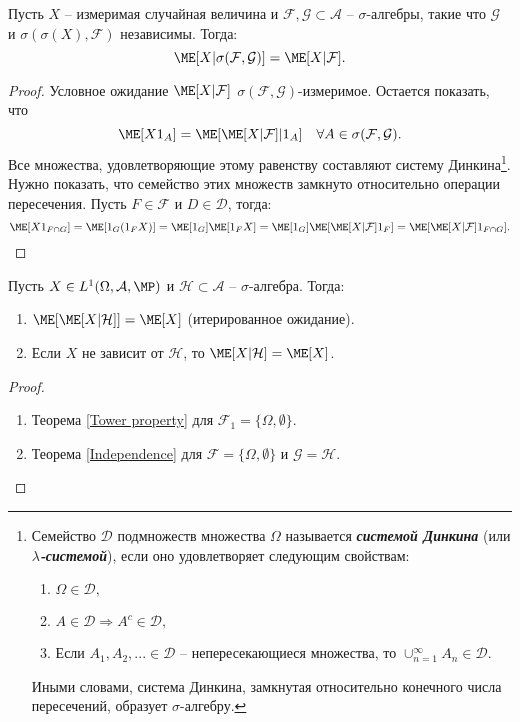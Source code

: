 \begin{thm} \label{Independence}
	Пусть $X$ -- измеримая случайная величина и $\mathcal{F}, \mathcal{G} \subset \mathcal{A}$ -- $\sigma$-алгебры, такие что $\mathcal{G}$ и $\sigma(\sigma(X), \mathcal{F})$ независимы. Тогда:
	\[ \ME[X|\sigma(\mathcal{F}, \mathcal{G})] = \ME[X|\mathcal{F}]. \]
\end{thm}
\begin{proof}
	Условное ожидание $\ME[X|\mathcal{F}]$ $\sigma(\mathcal{F},\mathcal{G})$-измеримое. Остается показать, что
	\[ \ME[X1_A]=\ME[\ME[X|\mathcal{F}]|1_A] \quad \forall A \in \sigma(\mathcal{F},\mathcal{G}). \]
	Все множества, удовлетворяющие этому равенству составляют систему Динкина\footnote{Семейство $\mathcal{D}$ подмножеств множества $\Omega$ называется \textbf{\textit{системой Динкина}} (или \textbf{\textit{$\lambda$-системой}}), если оно удовлетворяет следующим свойствам:
		\begin{enumerate}
			\item $\Omega \in \mathcal{D},$
			\item $A \in \mathcal{D} \Longrightarrow A^c \in \mathcal{D},$
			\item Если $A_1, A_2,... \in \mathcal{D}$ -- непересекающиеся множества, то $\cup_{n=1}^\infty A_n \in \mathcal{D}.$
		\end{enumerate}
		Иными словами, система Динкина, замкнутая относительно конечного числа пересечений, образует $\sigma$-алгебру.
		}. Нужно показать, что семейство этих множеств замкнуто относительно операции пересечения. Пусть $F \in \mathcal{F}$ и $D \in \mathcal{D}$, тогда:
	\[ \ME[X1_{F \cap G}]=\ME[1_G(1_FX)]=\ME[1_G]\ME[1_FX]=\ME[1_G]\ME[\ME[X|\mathcal{F}]1_F]=\ME[\ME[X|\mathcal{F}]1_{F \cap G}]. \]
\end{proof}

\begin{crlr} \label{crlr1.15}
	Пусть $X \in L^1(\Omega, \mathcal{A}, \MP)$ и $\mathcal{H} \subset \mathcal{A}$ -- $\sigma$-алгебра. Тогда:
	\begin{enumerate}
		\item $\ME[\ME[X|\mathcal{H}]]=\ME[X]$ (итерированное ожидание).
		\item Если $X$ не зависит от $\mathcal{H}$, то $\ME[X|\mathcal{H}]=\ME[X]$.
	\end{enumerate}
\end{crlr}
\begin{proof}
		\begin{enumerate}
			\item Теорема \ref{Tower property} для $\mathcal{F}_1=\{\Omega, \emptyset\}$.
			\item Теорема \ref{Independence} для $\mathcal{F}=\{\Omega, \emptyset\}$ и $\mathcal{G}=\mathcal{H}$.
		\end{enumerate}
\end{proof}

